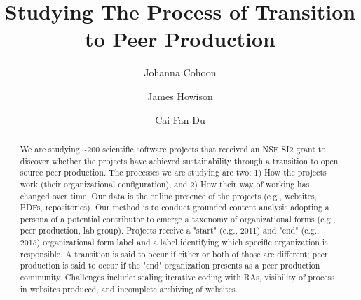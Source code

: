 \documentclass[sigchi-a,screen]{acmart}
\begin{document}
\title[Transition to peer production]{Studying The Process of Transition to Peer Production}

\author{Johanna Cohoon}
\author{James Howison}
\author{Cai Fan Du}

\renewcommand{\shortauthors}{Cohoon and Howison}

\begin{abstract}
  We are studying \textasciitilde200 scientific software projects that received an NSF SI2 grant to discover whether the projects have achieved sustainability through a transition to open source peer production. The processes we are studying are two: 1) How the projects work (their organizational configuration), and 2) How their way of working has changed over time. Our data is the online presence of the projects (e.g., websites, PDFs, repositories). Our method is to conduct grounded content analysis adopting a persona of a potential contributor to emerge a taxonomy of organizational forms (e.g., peer production, lab group). Projects receive a "start" (e.g., 2011) and "end" (e.g., 2015) organizational form label and a label identifying which specific organization is responsible. A transition is said to occur if either or both of those are different; peer production is said to occur if the "end" organization presents as a peer production community. Challenges include: scaling iterative coding with RAs, visibility of process in websites produced, and incomplete archiving of websites. 
\end{abstract}
\end{document}
